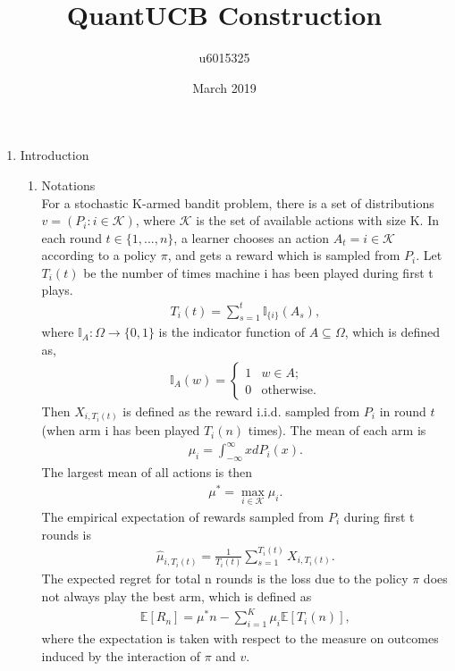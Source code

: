 \documentclass{article}
\title{QuantUCB Construction}
\author{u6015325 }
\date{March 2019}
\begin{document}
\maketitle

\begin{enumerate}
\item Introduction

    \begin{enumerate}
    \item Notations\\
    For a stochastic K-armed bandit problem, there is a set of distributions $v = (P_i: i \in \mathcal{K})$, where $\mathcal{K}$ is the set of available actions with size K. In each round $t \in \{1, ..., n\}$, a learner chooses an action $A_t = i \in \mathcal{K}$ according to a policy $\pi$, and gets a reward which is sampled from $P_i$. Let $T_i(t)$ be the number of times machine i has been played during first t plays. 
    \begin{align}
        T_i(t) = \sum_{s = 1}^t \mathbb{I}_{\{i\}} (A_s),
    \end{align}
    where $\mathbb{I}_A: \Omega\rightarrow \{0,1\}$ is the indicator function of $A \subseteq \Omega$, which is defined as, 
    \begin{align}
        \mathbb{I}_A(w) = \begin{cases}
                            1 & w \in A;\\
                            0 & \text{otherwise}.
                            \end{cases}
    \end{align}
    Then $X_{i,T_i(t)}$ is defined as the reward i.i.d. sampled from $P_i$ in round $t$ (when arm i has been played $T_i(n)$ times). The mean of each arm is
    \begin{align}
        \mu_i = \int_{-\infty}^{\infty} x dP_i(x).
    \end{align}
    The largest mean of all actions is then 
    \begin{align}
        \mu^\ast = \max_{i\in \mathcal{K}} \mu_i.
    \end{align}
    The empirical expectation of rewards sampled from $P_i$ during first t rounds is
    \begin{align}
        \hat{\mu}_{i,T_i(t)} = \frac{1}{T_i(t)} \sum_{s = 1}^{T_i(t)} X_{i, T_i(t)}.
    \end{align}
    The expected regret for total n rounds is the loss due to the policy $\pi$ does not always play the best arm, which is defined as 
    \begin{align}
        \label{regret}
        \mathbb{E}[R_n] = \mu^\ast n -  \sum_{i=1}^K \mu_i \mathbb{E}[T_i(n)],
    \end{align}
    where the expectation is taken with respect to the measure on outcomes induced by the interaction of $\pi$ and $v$.
    

\end{enumerate}
\end{enumerate}
\end{document}
